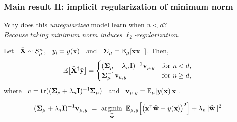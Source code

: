 \documentclass{beamer}
\begin{document}
\begin{frame}
  \frametitle{Main result II: implicit regularization of minimum norm}
Why does this \textit{unregularized} model learn when $n<d$?\\
  \pause
\textit{Because taking minimum norm induces
  $\ell_2$-regularization.}
\vspace{2mm}
\pause
\begin{theorem}
Let \ ${\bar{\mathbf X}}\sim S_\mu^n$, \ ${\bar y}_i=y(\mathbf x)$ \ and \
$\Sigmab_\mu=\E_\mu[\x\x^\top]$. Then,\pause
 \begin{align*}
    \mathbb E\big[{\bar{\mathbf X}}^\dagger\bar{\mathbf y}\big] = 
    \begin{cases}
       (\mathbf{\Sigma}_\mu + \lambda_n\mathbf I)^{-1}\mathbf v_{\mu,y} &\text{for }n<d,\\
        \mathbf{\Sigma}_\mu^{-1}\mathbf v_{\mu,y} &\text{for }n \ge d,
    \end{cases}
 \end{align*}
   where \ $n=\mathrm{tr}((\mathbf{\Sigma}_\mu+\lambda_n\mathbf I)^{-1}\mathbf{\Sigma}_\mu)$ \ and \ $\mathbf v_{\mu,y}=\mathbb E_\mu[y(\mathbf x)\,\mathbf x ]$.
\end{theorem}
\pause
\begin{align*}
  (\Sigmab_\mu +  \lambda_n\I)^{-1}\v_{\mu,y}
  \ =\ \argmin_{\wbh} \ \E_{\mu,y}\Big[\big(\x^\top\wbh-y(\x)\big)^2\Big]
    + \lambda_n\|\wbh\|^2
\end{align*}
\end{frame}
\end{document}
